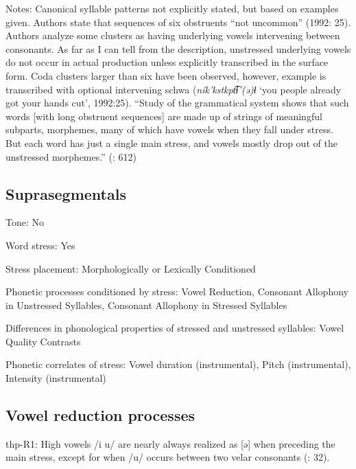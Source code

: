 {\begin{appendixdesc}
\item[Notes:] Canonical syllable patterns not explicitly stated, but based on examples given. Authors state that sequences of six obstruents “not uncommon” (1992: 25). Authors analyze some clusters as having underlying vowels intervening between consonants. As far as I can tell from the description, unstressed underlying vowels do not occur in actual production unless explicitly transcribed in the surface form. Coda clusters larger than six have been observed, however, example is transcribed with optional intervening schwa (\textit{ník’kstkpt͡ɬ’(ə)ɬ} ‘you people already got your hands cut’, 1992:25). “Study of the grammatical system shows that such words [with long obstruent sequences] are made up of strings of meaningful subparts, morphemes, many of which have vowels when they fall under stress. But each word has just a single main stress, and vowels mostly drop out of the unstressed morphemes.” (\citealt{ThompsonEtAl1996}: 612)
\end{appendixdesc}
\subsection*{Suprasegmentals}
\begin{appendixdesc}
\item[Tone:] No

\item[Word stress:] Yes

\item[Stress placement:] Morphologically or Lexically Conditioned

\item[Phonetic processes conditioned by stress:] Vowel Reduction, Consonant Allophony in Unstressed Syllables, Consonant Allophony in Stressed Syllables

\item[Differences in phonological properties of stressed and unstressed syllables:] Vowel Quality Contrasts

\item[Phonetic correlates of stress:] Vowel duration (instrumental), Pitch (instrumental), Intensity (instrumental)
\end{appendixdesc}
\subsection*{Vowel reduction processes}
\begin{appendixdesc}

\item[thp-R1:] High vowels /i u/ are nearly always realized as [ə] when preceding the main stress, except for when /u/ occurs between two velar consonants (\citealt{ThompsonThompson1992}: 32).


\end{appendixdesc}}
